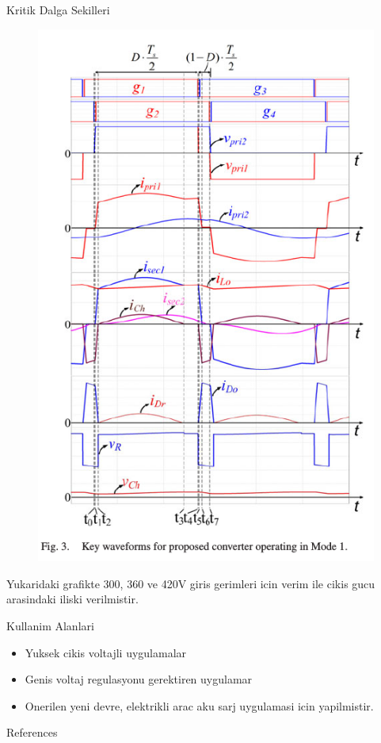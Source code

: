 \documentclass[10pt]{beamer}
\begin{document}
\begin{frame}{Kritik Dalga Sekilleri}
	\begin{figure}
		\centering
		\includegraphics[scale=0.30]{key_waveforms.png}
	\end{figure}
	Yukaridaki grafikte 300, 360 ve 420V giris gerimleri icin verim ile cikis gucu arasindaki iliski verilmistir.
\end{frame}

\begin{frame}[fragile]{Kullanim Alanlari}
	\begin{itemize}
		\item Yuksek cikis voltajli uygulamalar
		\item Genis voltaj regulasyonu gerektiren uygulamar
		\item Onerilen yeni devre, elektrikli arac aku sarj uygulamasi icin yapilmistir.
	\end{itemize}
\end{frame}	


\begin{frame}[allowframebreaks]{References}

  
  

\end{frame}
\end{document}
